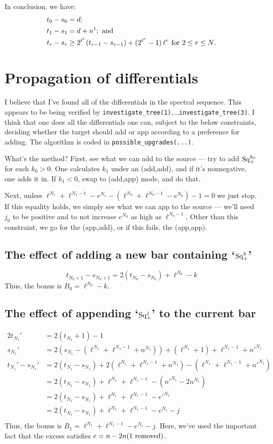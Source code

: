 \documentclass[10pt]{article}
\newcommand{\SqShift}{\Sq_{\smash{+}}}
\newcommand{\Sq}{\mathrm{Sq}}
\begin{document}
\begin{conjectured differentials}
In conclusion, we have:
\begin{alignat*}{2}
t_0-s_0
&=
d;%
\\
t_1-s_1
&=
d+n^1;\textup{\ and}\\
t_r-s_r
&\geq
2^{\ell^r}(t_{r-1}-s_{r-1})+(2^{\ell^r}-1)\,\ell^r
\text{\ for $2\leq r\leq N$.}
\end{alignat*}
\section{Propagation of differentials}
I believe that I've found all of the differentials in the spectral sequence. This appears to be being verified by \verb|investigate_tree(1)|,..,\verb|investigate_tree(3)|. I think that one does all the differentials one can, subject to the below constraints, deciding whether the target should add or app according to a preference for adding. The algorithm is coded in \verb|possible_upgrades(...)|.

What's the method? First, see what we can add to the source --- try to add $\SqShift^{k_0}$ for each $k_0>0$. One calculates $k_1$ under an (add,add), and if it's nonnegative, one adds it in. If $k_1<0$, swap to (add,app) mode, and do that.

Next, unless $\ell^{N_1}+\ell^{N_1-1}-e^{N_1}-(\ell^{N_0}+\ell^{N_0-1}-e^{N_0})-1=0$ we just stop. If this equality holds, we simply see what we can app to the source --- we'll need $j_0$ to be positive and to not increase $e^{N_0}$ as high as $\ell^{N_0-1}$. Other than this constraint, we go for the (app,add), or if this fails, the (app,app).

\subsection{The effect of adding a new bar containing `$\SqShift^k$'}
\[t_{N_0+1}-s_{N_0+1}=
2(t_{N_0}-s_{N_0})+\ell^{N_0}-k\]
Thus, the bonus is $B_0=\ell^{N_0}-k$.

\subsection{The effect of appending `$\SqShift^j$' to the current bar}
\begin{alignat*}{2}
t_{N_1}'
&=
2(t_{N_1}+1)-1%
\\
s_{N_1}'&=
2(s_{N_1}-(\ell^{N_1}+\ell^{N_1-1}+n^{N_1}))+(\ell^{N_1}+1)+\ell^{N_1-1}+{n'}^{N_1}\\
t_{N_1}'-s_{N_1}'&=2(t_{N_1}-s_{N_1})+2(\ell^{N_1}+\ell^{N_1-1}+n^{N_1})-(\ell^{N_1}+\ell^{N_1-1}+{n'}^{N_1})\\
&=2(t_{N_1}-s_{N_1})+\ell^{N_1}+\ell^{N_1-1}-({n'}^{N_1}-2n^{N_1})\\
&=2(t_{N_1}-s_{N_1})+\ell^{N_1}+\ell^{N_1-1}-{e'}^{N_1}\\
&=2(t_{N_1}-s_{N_1})+\ell^{N_1}+\ell^{N_1-1}-{e}^{N_1}-j\\
\end{alignat*}
Thus, the bonus is $B_1=\ell^{N_1}+\ell^{N_1-1}-{e}^{N_1}-j$.
Here, we've used the important fact that the excess satisfies $e=n-2n(1\textup{ removed})$.

\end{conjectured differentials}
\end{document}
